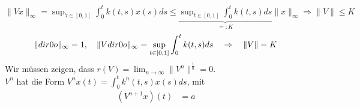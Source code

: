 \begin{beweis}
	$\| V x \|_{\infty} = \sup_{7 \in [0, 1]} \int_{0}^{t} k(t, s) x(s) ds \leq \underbrace{\sup_{t \in [0, 1]} \int_{0}^{t} k(t, s) ds}_{=: K} \| x \|_{\infty} \Rightarrow \| V \| \leq K$ \\
	\[ \| \1 \|_{\infty} = 1, \quad \| V \1 \|_{\infty} = \sup_{t \in [0, 1]} \int_{0}^{t} k(t, s) ds \quad \Rightarrow \quad \| V \| = K \]
	Wir müssen zeigen, dass $r(V) = \lim_{n \rightarrow \infty} \| V^{n} \|^{\frac{1}{n}} = 0$. \\
	$V^{n}$ hat die Form $V^{n} x(t) = \int_{0}^{t} k^{n}(t, s) x(s) ds$, mit
	\begin{align*}
		\left( V^{n + 1} x \right)(t) & = a
	\end{align*}
\end{beweis}



\newpage